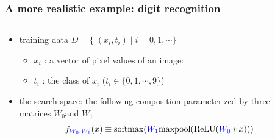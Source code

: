 \documentclass[12pt,dvipdfmx]{beamer}
\newcommand{\ao}[1]{{\color{blue}#1}}
\begin{document}
\begin{frame}
\frametitle{A more realistic example: digit recognition}
\begin{columns}
\begin{column}{0.75\textwidth}
\begin{itemize}
\item<1-> training data $D = \{\;(x_i,t_i)\;|\; i = 0, 1, \cdots \}$
  \begin{itemize}
  \item $x_i$ : a vector of pixel values of an image:
  \item $t_i$ : the class of $x_i$ ($t_i \in \{ 0, 1, \cdots , 9 \}$)
  \end{itemize}

\item<2-> the search space: the following composition
  parameterized by three matrices \ao{$W_0$}and {$W_1$}
\[ f_{\ao{W_0,W_1}} (x) \equiv \softmax(\ao{W_1} \maxpool(\ReLU(\ao{W_0} \ast x))) \]

\end{itemize}
\end{column}

\begin{column}{0.25\textwidth}
\begin{center}
\end{center}
\end{column}
\end{columns}
\end{frame}
\end{document}
